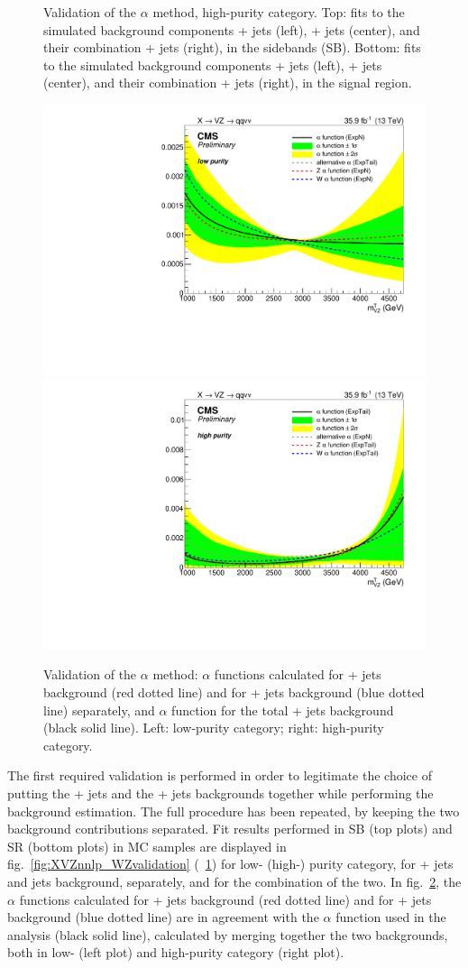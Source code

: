 \begin{figure}[!htb]
  \caption{Validation of the $\alpha$ method, high-purity category. Top: fits to the simulated background components \Z + jets (left), \W + jets (center), and their combination \V + jets (right), in the sidebands (SB). Bottom: fits to the simulated background components \Z + jets (left), \W + jets (center), and their combination \V + jets (right), in the signal region.}
  \label{fig:XVZnnhp_WZvalidation}
\end{figure}

\begin{figure}[!htb]
  \centering
    \includegraphics[width=.495\textwidth]{plotsAlpha_tesi/XVZnnlp/FourAlphaRatio.pdf}
    \includegraphics[width=.495\textwidth]{plotsAlpha_tesi/XVZnnhp/FourAlphaRatio.pdf}
  \caption{Validation of the $\alpha$ method: $\alpha$ functions calculated for \Z + jets background (red dotted line) and for \W + jets background (blue dotted line) separately, and $\alpha$ function for the total \V + jets background (black solid line). Left: low-purity category; right: high-purity category.}
  \label{fig:XVZnn_WZvalidation}
\end{figure}

The first required validation is performed in order to legitimate the choice of putting the \Z + jets and the \W + jets backgrounds together while performing the background estimation. The full procedure has been repeated, by keeping the two background contributions separated. Fit results performed in SB (top plots) and SR (bottom plots) in MC samples are displayed in fig.~\ref{fig:XVZnnlp_WZvalidation} (~\ref{fig:XVZnnhp_WZvalidation}) for low- (high-) purity category, for \Z + jets and \W jets background, separately, and for the combination of the two. In fig.~\ref{fig:XVZnn_WZvalidation}, the $\alpha$ functions calculated for \Z + jets background (red dotted line) and for \W + jets background (blue dotted line) are in agreement with the $\alpha$ function used in the analysis (black solid line), calculated by merging together the two backgrounds, both in low- (left plot) and high-purity category (right plot).


